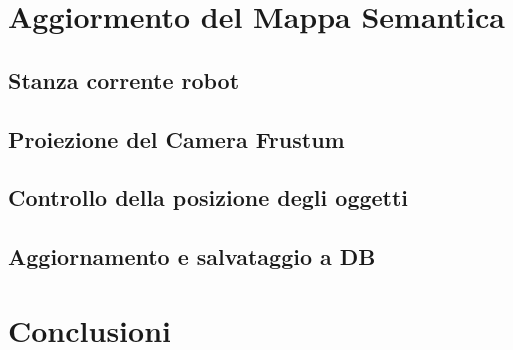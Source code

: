 \section{Aggiormento del Mappa Semantica}
\subsection{Stanza corrente robot}
\subsection{Proiezione del Camera Frustum}
\subsection{Controllo della posizione degli oggetti}
\subsection{Aggiornamento e salvataggio a DB}



\section{Conclusioni}

